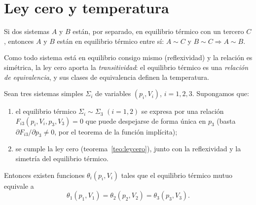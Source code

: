\section{Ley cero y temperatura}
\begin{teorema}\label{teo:leycero}
Si dos sistemas $A$ y $B$ están, por separado, en equilibrio térmico con un tercero $C$, entonces
$A$ y $B$ están en equilibrio térmico entre sí: $A\sim C$ y $B\sim C\Rightarrow A\sim B$.
\end{teorema}

Como todo sistema está en equilibrio consigo mismo (reflexividad) y la relación es simétrica, la
ley cero aporta la \emph{transitividad}: el equilibrio térmico es una \emph{relación de equivalencia},
y sus clases de equivalencia definen la temperatura.

\begin{proposicion}
Sean tres sistemas simples $\Sigma_i$ de variables $(p_i,V_i)$, $i=1,2,3$. Supongamos que:
\begin{enumerate}[label=(H\arabic*),leftmargin=2.6em]
\item el equilibrio térmico $\Sigma_i\sim\Sigma_3$ $(i=1,2)$ se expresa por una relación
  $F_{i3}(p_i,V_i,p_3,V_3)=0$ que puede despejarse de forma única en $p_3$ (basta
  $\partial F_{i3}/\partial p_3\neq0$, por el teorema de la función implícita);
\item se cumple la ley cero (teorema~\ref{teo:leycero}), junto con la reflexividad y la simetría del
  equilibrio térmico.
\end{enumerate}
Entonces existen funciones $\theta_i(p_i,V_i)$ tales que el equilibrio térmico mutuo equivale a
\begin{equation}\label{eq:theta}
  \theta_1(p_1,V_1)=\theta_2(p_2,V_2)=\theta_3(p_3,V_3).
\end{equation}
\end{proposicion}

